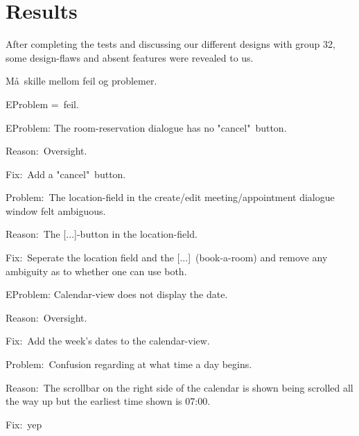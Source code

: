 \documentclass{article}
\begin{document}
\section{Results}

After completing the tests and discussing our different designs with group
32, some design-flaws and absent features were revealed to us.

M\aa\ skille mellom feil og problemer.

EProblem =\ feil.

EProblem: The room-reservation dialogue has no "cancel"\ button.

Reason:\ Oversight.

Fix:\ Add a "cancel"\ button.

\bigskip

Problem:\ The location-field in the create/edit meeting/appointment dialogue
window felt ambiguous.

Reason:\ The [...]-button in the location-field.

Fix:\ Seperate the location field and the [...]\ (book-a-room) and remove
any ambiguity as to whether one can use both.

\bigskip 

EProblem: Calendar-view does not display the date.

Reason:\ Oversight.

Fix:\ Add the week's dates to the calendar-view.

\bigskip 

Problem:\ Confusion regarding at what time a day begins.

Reason:\ The scrollbar on the right side of the calendar is shown being
scrolled all the way up but the earliest time shown is 07:00.

Fix:\ yep
\end{document}
